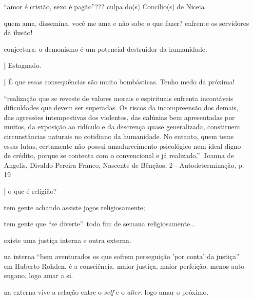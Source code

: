 \documentclass[12pt,a4paper]{article}
\begin{document}
			\textquotedblleft amor\cite{x} \'e crist\~ao, sexo \'e pag\~ao\textquotedblright\cite{x}??? culpa do(s) Conc\'ilio(s)\cite{x} de Niceia

			quem ama, dissemina. voc\^e me ama e n\~ao sabe o que fazer? enfrente os servidores da ilus\~ao! %

			conjectura: o demonismo \'e um potencial destruidor da humanidade.

			\begin{flushright}
			\end{flushright}

| Estagnado.

| \'E que essas consequ\^encias s\~ao muito bomb\'asticas. Tenho medo da pr\'oxima!

\textquotedblleft realiza\c{c}\~ao que se reveste de valores morais e espirituais enfrenta incont\'aveis dificuldades que devem ser superadas. Os riscos da incompreens\~ao dos demais, das agress\~oes intempestivas dos violentos, das cal\'unias bem apresentadas por muitos, da exposi\c{c}\~ao ao rid\'iculo e da descren\c{c}a quase generalizada, constituem circunst\^ancias naturais no cotidiano da humanidade. No entanto, quem teme essas lutas, certamente n\~ao possui amadurecimento psicol\'ogico nem ideal digno de cr\'edito, porque se contenta com o convencional e j\'a realizado.\textquotedblright\, Joanna de Angelis, Divaldo Pereira Franco, Nascente de B\^en\c{c}\~aos, 2 - Autodetermina\c{c}\~ao, p. 19

			\begin{flushright}
			\end{flushright}

| o que \'e religi\~ao?

tem gente achando assiste jogos religiosamente;

tem gente que \textquotedblleft se diverte\textquotedblright\, todo fim de semana religiosamente...

			\begin{flushright}
			\end{flushright}

existe uma justi\c{c}a interna e outra externa.

na interna \textquotedblleft bem aventurados os que sofrem persegui\c{c}\~ao 'por conta' da justi\c{c}a\textquotedblright\, em Huberto Rohden. \'e a consci\^encia. maior justi\c{c}a, maior perfei\c{c}\~ao. menos auto-engano. logo amar a si.

na externa vive a rela\c{c}\~ao entre o \emph{self} e o \emph{alter}. logo amar o pr\'oximo.
\end{document}
